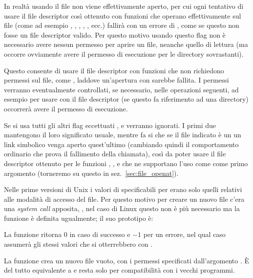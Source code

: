In realtà usando  il file non viene effettivamente aperto, per
cui ogni tentativo di usare il file descriptor così ottenuto con funzioni che
operano effettivamente sul file (come ad esempio , ,
, , , ecc.) fallirà con un errore di
, come se questo non fosse un file descriptor valido. Per questo
motivo usando questo flag non è necessario avere nessun permesso per aprire un
file, neanche quello di lettura (ma occorre ovviamente avere il permesso di
esecuzione per le directory sovrastanti).

Questo consente di usare il file descriptor con funzioni che non richiedono
permessi sul file, come , laddove un'apertura con
 sarebbe fallita. I permessi verranno eventualmente
controllati, se necessario, nelle operazioni seguenti, ad esempio per usare
 con il file descriptor (se questo fa riferimento ad una
directory) occorrerà avere il permesso di esecuzione.

Se si usa  tutti gli altri flag eccettuati ,
 e  verranno ignorati. I primi due
mantengono il loro significato usuale, mentre  fa si che se
il file indicato è un un link simbolico venga aperto quest'ultimo (cambiando
quindi il comportamento ordinario che prova il fallimento della chiamata),
così da poter usare il file descriptor ottenuto per le funzioni
, ,  e  che ne
supportano l'uso come come primo argomento (torneremo su questo in
sez.~\ref{sec:file_openat}).

Nelle prime versioni di Unix i valori di  specificabili per
 erano solo quelli relativi alle modalità di accesso del file.  Per
questo motivo per creare un nuovo file c'era una \textit{system call}
apposita, , nel caso di Linux questo non è più necessario ma la
funzione è definita ugualmente; il suo prototipo è:

\begin{funcproto}{
}

{La funzione ritorna $0$ in caso di successo e $-1$ per un errore, nel qual
  caso  assumerà gli stessi valori che si otterrebbero con
  .}
\end{funcproto}

La funzione crea un nuovo file vuoto, con i permessi specificati
dall'argomento . È del tutto equivalente a  e resta solo per compatibilità con i
vecchi programmi.

